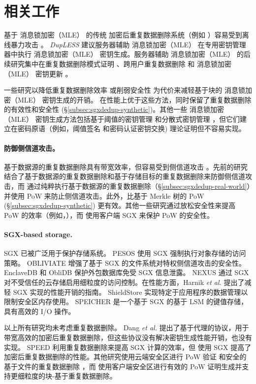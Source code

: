 \section{相关工作}
\label{sec:sgxdedup-related_work}

 基于 消息锁加密（MLE） 的传统 \cite{bellare2013MLE} 加密后重复数据删除系统（例如 \cite{adya02,cox02,shah15}）容易受到离线暴力攻击 \cite{bellare13b}。 {\em DupLESS} \cite{bellare13b} 建议服务器辅助 消息锁加密（MLE） 在专用密钥管理器中执行 消息锁加密（MLE） 密钥生成。服务器辅助 消息锁加密（MLE） 的后续研究集中在重复数据删除模式证明 \cite{armknecht15}、跨用户重复数据删除 \cite{zhou15} 和 消息锁加密（MLE） 密钥更新 \cite{qin17}。

一些研究以降低重复数据删除效率 \cite{zhou15,qin17} 或削弱安全性 \cite{li20a} 为代价来减轻基于块的 消息锁加密（MLE） 密钥生成的开销。 \sysnameS 在性能上优于这些方法，同时保留了重复数据删除的有效性和安全性 (\S\ref{subsec:sgxdedup-synthetic})。其他一些 消息锁加密（MLE） 密钥生成方法包括基于阈值的密钥管理 \cite{duan14} 和分散式密钥管理 \cite{liu15}，但它们建立在密码原语（例如，阈值签名 \cite{duan14} 和密码认证密钥交换\cite{liu15}) 理论证明但不容易实现。

\paragraph*{防御侧信道攻击。} 基于数据源的重复数据删除具有带宽效率，但容易受到侧信道攻击 \cite{harnik10}。先前的研究 \cite{harnik10, li15} 结合了基于数据源的重复数据删除和基于存储目标的重复数据删除来防御侧信道攻击，而 \sysnameS 通过纯粹执行基于数据源的重复数据删除（\S\ref{subsec:sgxdedup-real-world}）并使用 PoW 来防止侧信道攻击。此外，\sysnameS 比基于 Merkle 树的 PoW (\S\ref{subsec:sgxdedup-synthetic}) 更有效。其他一些研究通过放松安全性来提高 PoW 的效率（例如，\cite{pietro12,xu13}），而 \sysnameS 使用客户端 SGX 来保护 PoW 的安全性。

\paragraph*{SGX-based storage.} SGX \cite{sgx} 已被广泛用于保护存储系统。 PESOS \cite{krahn18} 使用 SGX 强制执行对象存储的访问策略。 OBLIVIATE \cite{ahmad18} 增强了基于 SGX 的文件系统对特权侧信道攻击的安全性。 EnclaveDB \cite{priebe18} 和 ObliDB \cite{eskandarian19} 保护外包数据库免受 SGX 信息泄露。 NEXUS \cite{djoko19} 通过 SGX 对不受信任的云存储启用细粒度的访问控制。在性能方面，Harnik \textit{ et al.} \cite{harnik18} 提出了减轻 SGX 实现的性能开销的指南。 ShieldStore \cite{kim19} 实现特定于应用程序的数据管理以限制安全区内存使用。 SPEICHER \cite{bailleu19} 是一个基于 SGX 的基于 LSM 的键值存储，具有高效的 I/O 操作。

以上所有研究均未考虑重复数据删除。 Dang \textit{ et al.} \cite{dang17} 提出了基于代理的协议，用于带宽高效的加密后重复数据删除，但这些协议没有解决密钥生成性能开销，也没有实现。 SPEED \cite{cui19} 利用重复数据删除来提高 SGX 计算的效率，但 \sysnameS 使用 SGX 提高了加密后重复数据删除的性能。其他研究使用云端安全区进行 PoW 验证 \cite{you20} 和安全的基于文件的重复数据删除 \cite{fuhry20}，而 \sysnameS 使用客户端安全区进行有效的 PoW 证明生成并支持更细粒度的块-基于重复数据删除。

